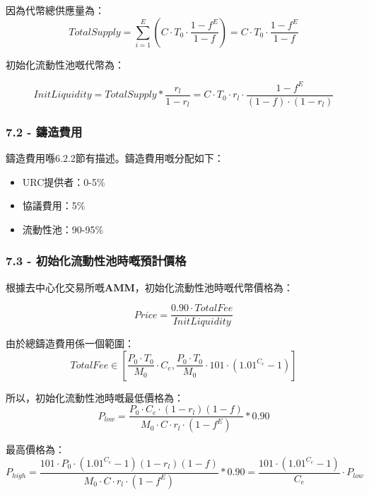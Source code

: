 \documentclass[
]{article}
\providecommand{\tightlist}{%
  \setlength{\itemsep}{0pt}\setlength{\parskip}{0pt}}
\begin{document}
因為代幣總供應量為： \begin{equation}
TotalSupply = \sum_{i=1}^{E}(C \cdot T_0 \cdot \frac{1-f^{E}}{1-f})=C \cdot T_0 \cdot \frac{1-f^{E}}{1-f}
\end{equation}

初始化流動性池嘅代幣為：

\begin{equation}
InitLiquidity = TotalSupply * \frac{r_l}{1-r_l} = C \cdot T_0 \cdot r_l \cdot \frac{1-f^{E}}{(1-f) \cdot (1-r_l)}
\end{equation}

\subsubsection{7.2 - 鑄造費用}\label{ux9444ux9020ux8cbbux7528}

鑄造費用喺6.2.2節有描述。鑄造費用嘅分配如下：

\begin{itemize}
\tightlist
\item
  URC提供者：0-5\%
\item
  協議費用：5\%
\item
  流動性池：90-95\%
\end{itemize}

\subsubsection{7.3 -
初始化流動性池時嘅預計價格}\label{ux521dux59cbux5316ux6d41ux52d5ux6027ux6c60ux6642ux5605ux9810ux8a08ux50f9ux683c}

根據去中心化交易所嘅\textbf{AMM}，初始化流動性池時嘅代幣價格為：

\begin{equation}
Price = \frac{0.90 \cdot TotalFee}{InitLiquidity}
\end{equation}

由於總鑄造費用係一個範圍： \begin{equation}
TotalFee \in [\frac{P_0 \cdot T_0}{M_0} \cdot C_e, \frac{P_0 \cdot T_0}{M_0} \cdot 101 \cdot (1.01^{C_e}-1)]
\end{equation}

所以，初始化流動性池時嘅最低價格為： \begin{equation}
P_{low} = \frac{P_0 \cdot C_e \cdot (1-r_l)(1-f)}{M_0 \cdot C \cdot r_l \cdot (1-f^E)}*0.90
\end{equation}

最高價格為： \begin{equation}
P_{high} = \frac{101 \cdot P_0 \cdot (1.01^{C_e}-1)(1-r_l)(1-f)}{M_0 \cdot C \cdot r_l \cdot (1-f^E)}*0.90=\frac{101 \cdot (1.01^{C_e}-1)}{C_e} \cdot P_{low}
\end{equation}
\end{document}
